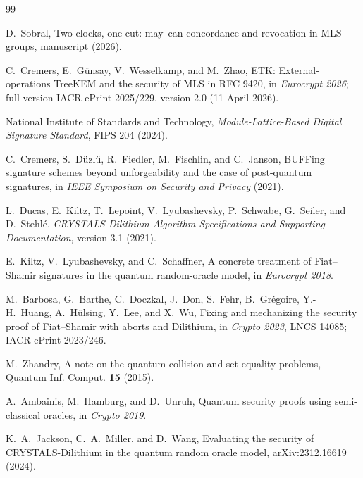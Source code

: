 \documentclass[aps,prx,reprint,superscriptaddress,nofootinbib,floatfix]{revtex4-2}
\theoremstyle{remark}
\begin{document}
\begin{thebibliography}{99}

 D.~Sobral, Two clocks, one cut: may--can concordance and revocation in MLS groups, manuscript (2026).

 C.~Cremers, E.~G\"unsay, V.~Wesselkamp, and M.~Zhao, ETK: External-operations TreeKEM and the security of MLS in RFC 9420, in \emph{Eurocrypt 2026}; full version IACR ePrint 2025/229, version 2.0 (11 April 2026).

 National Institute of Standards and Technology, \emph{Module-Lattice-Based Digital Signature Standard}, FIPS 204 (2024).

 C.~Cremers, S.~D\"uzl\"u, R.~Fiedler, M.~Fischlin, and C.~Janson, BUFFing signature schemes beyond unforgeability and the case of post-quantum signatures, in \emph{IEEE Symposium on Security and Privacy} (2021).

 L.~Ducas, E.~Kiltz, T.~Lepoint, V.~Lyubashevsky, P.~Schwabe, G.~Seiler, and D.~Stehl\'e, \emph{CRYSTALS-Dilithium Algorithm Specifications and Supporting Documentation}, version 3.1 (2021).

 E.~Kiltz, V.~Lyubashevsky, and C.~Schaffner, A concrete treatment of Fiat--Shamir signatures in the quantum random-oracle model, in \emph{Eurocrypt 2018}.

 M.~Barbosa, G.~Barthe, C.~Doczkal, J.~Don, S.~Fehr, B.~Gr\'egoire, Y.-H.~Huang, A.~H\"ulsing, Y.~Lee, and X.~Wu, Fixing and mechanizing the security proof of Fiat--Shamir with aborts and Dilithium, in \emph{Crypto 2023}, LNCS 14085; IACR ePrint 2023/246.

 M.~Zhandry, A note on the quantum collision and set equality problems, Quantum Inf. Comput. \textbf{15} (2015).

 A.~Ambainis, M.~Hamburg, and D.~Unruh, Quantum security proofs using semi-classical oracles, in \emph{Crypto 2019}.

 K.~A.~Jackson, C.~A.~Miller, and D.~Wang, Evaluating the security of CRYSTALS-Dilithium in the quantum random oracle model, arXiv:2312.16619 (2024).

\end{thebibliography}
\end{document}
